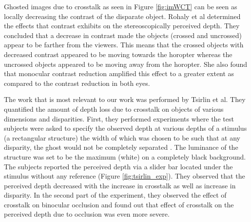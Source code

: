 Ghosted images due to crosstalk as seen in Figure \ref{fig:imWCT} can be seen as locally decreasing the contrast of the disparate object. Rohaly et al\cite{rohaly1999effects} determined the effects that contrast exhibits on the stereoscopically perceived depth. They concluded that a decrease in contrast made the objects (crossed and uncrossed) appear to be farther from the viewers. This means that the crossed objects with decreased contrast appeared to be moving towards the horopter whereas the uncrossed objects appeared to be moving away from the horopter. She also found that monocular contrast reduction amplified this effect to a greater extent as compared to the contrast reduction in both eyes.

The work that is most relevant to our work was performed by Tsirlin et al\cite{tsirlin2012effect}\cite{tsirlin2011effect}\cite{tsirlin2012crosstalk}. They quantified the amount of depth loss due to crosstalk on objects of various dimensions and disparities. First, they performed experiments where the test subjects were asked to specify the observed depth at various depths of a stimulus (a rectangular structure) the width of which was chosen to be such that at any disparity, the ghost would not be completely separated \cite{tsirlin2011effect}. The luminance of the structure was set to be the maximum (white) on a completely black background. The subjects reported the perceived depth via a slider bar located under the stimulus without any reference (Figure \ref{fig:tsirlin_exp}). They observed that the perceived depth decreased with the increase in crosstalk as well as increase in disparity. In the second part of the experiment, they observed the effect of crosstalk on binocular occlusion and found out that effect of crosstalk on the perceived depth due to occlusion was even more severe.
